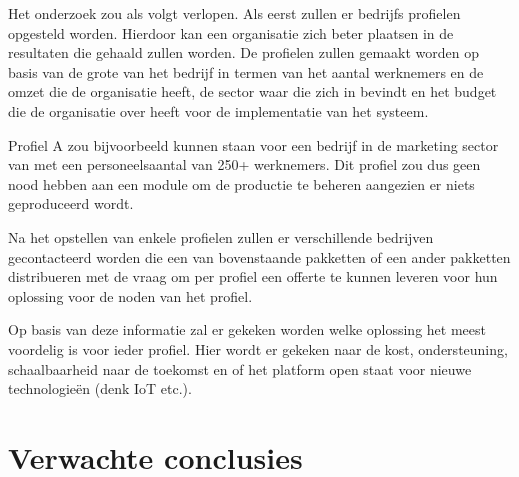 \documentclass{hogent-article}
\begin{document}

Het onderzoek zou als volgt verlopen. Als eerst zullen er bedrijfs profielen opgesteld worden. Hierdoor kan een organisatie zich beter plaatsen in de resultaten die gehaald zullen worden. De profielen zullen gemaakt worden op basis van de grote van het bedrijf in termen van het aantal werknemers en de omzet die de organisatie heeft, de sector waar die zich in bevindt en het budget die de organisatie over heeft voor de implementatie van het systeem. \par

Profiel A zou bijvoorbeeld kunnen staan voor een bedrijf in de marketing sector van met een personeelsaantal van 250+ werknemers. Dit profiel zou dus geen nood hebben aan een module om de productie te beheren aangezien er niets geproduceerd wordt.\par 

Na het opstellen van enkele profielen zullen er verschillende bedrijven gecontacteerd worden die een van bovenstaande pakketten of een ander pakketten distribueren met de vraag om per profiel een offerte te kunnen leveren voor hun oplossing voor de noden van het profiel.\par

Op basis van deze informatie zal er gekeken worden welke oplossing het meest voordelig is voor ieder profiel. Hier wordt er gekeken naar de kost, ondersteuning, schaalbaarheid naar de toekomst en of het platform open staat voor nieuwe technologieën (denk IoT etc.). 

\section{Verwachte conclusies}

\end{document}

